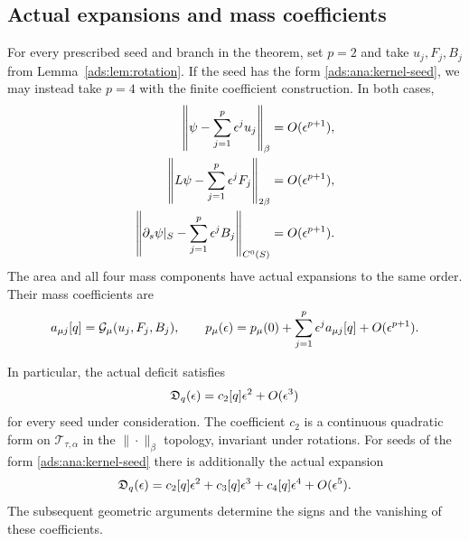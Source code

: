 \subsection{Actual expansions and mass coefficients}

\begin{proposition}
\label{ads:prop:expansions}
For every prescribed seed and branch in the theorem, set $p=2$ and
take $u_j,F_j,B_j$ from Lemma~\ref{ads:lem:rotation}.  If the seed has the
form \eqref{ads:ana:kernel-seed}, we may instead take $p=4$ with the
finite coefficient construction.  In both cases,
\begin{align}
 \left\|\psi-\sum_{j=1}^p\epsilon^ju_j\right\|_\beta
     &=O(\epsilon^{p+1}),\notag\\
 \left\|L\psi-\sum_{j=1}^p\epsilon^jF_j\right\|_{2\beta}
     &=O(\epsilon^{p+1}),\notag\\
 \left\|\partial_s\psi|_S-\sum_{j=1}^p\epsilon^jB_j\right\|_{C^0(S)}
     &=O(\epsilon^{p+1}).
 \label{ads:ana:three-remainders}
\end{align}
The area and all four mass components have actual expansions to the
same order.  Their mass coefficients are
\begin{equation}
 a_{\mu j}[q]=\mathcal G_\mu(u_j,F_j,B_j),\qquad
 p_\mu(\epsilon)=p_\mu(0)+\sum_{j=1}^p\epsilon^j a_{\mu j}[q]
                      +O(\epsilon^{p+1}).
 \label{ads:ana:mass-coefficients}
\end{equation}

In particular, the actual deficit satisfies
\begin{equation}
 \mathfrak D_q(\epsilon)=c_2[q]\epsilon^2+O(\epsilon^3)
 \label{ads:ana:deficit-second}
\end{equation}
for every seed under consideration.  The coefficient $c_2$ is a
continuous quadratic form on $\mathscr T_{\tau,\alpha}$ in the
$\|\cdot\|_\beta$ topology, invariant under rotations.  For seeds
of the form \eqref{ads:ana:kernel-seed} there is additionally the actual
expansion
\begin{equation}
 \mathfrak D_q(\epsilon)
     =c_2[q]\epsilon^2+c_3[q]\epsilon^3+c_4[q]\epsilon^4+O(\epsilon^5).
 \label{ads:ana:deficit-fourth}
\end{equation}
The subsequent geometric arguments determine the signs and the
vanishing of these coefficients.
\end{proposition}

